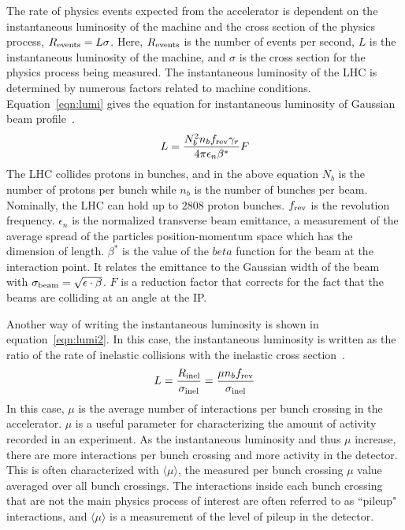 The rate of physics events expected from the accelerator is dependent on the instantaneous luminosity of the machine and the cross section of the physics process, $R_{\rm events} = L\sigma$. Here, $R_{\rm events}$ is the number of events per second, $L$ is the instantaneous luminosity of the machine, and $\sigma$ is the cross section for the physics process being measured. The instantaneous luminosity of the LHC is determined by numerous factors related to machine conditions. Equation~\ref{eqn:lumi} gives the equation for instantaneous luminosity of Gaussian beam profile~\cite{LHCReview}.
%
\begin{equation}
\label{eqn:lumi}
L = \frac{N_b^2 n_b f_{\rm rev} \gamma_r}{4\pi \epsilon_n \beta^*} F
\end{equation}
%
The LHC collides protons in bunches, and in the above equation $N_b$ is the number of protons per bunch while $n_b$ is the number of bunches per beam. Nominally, the LHC can hold up to $2808$ proton bunches. $f_{\rm rev}$ is the revolution frequency. $\epsilon_n$ is the normalized transverse beam emittance, a measurement of the average spread of the particles position-momentum space which has the dimension of length. $\beta^*$ is the value of the $beta$ function for the beam at the interaction point. It relates the emittance to the Gaussian width of the beam with $\sigma_{\rm beam} = \sqrt{\epsilon \cdot \beta}$. $F$ is a reduction factor that corrects for the fact that the beams are colliding at an angle at the IP. 

Another way of writing the instantaneous luminosity is shown in equation~\ref{eqn:lumi2}. In this case, the instantaneous luminosity is written as the ratio of the rate of inelastic collisions with the inelastic cross section~\cite{lumi-paper}. 
%
\begin{equation}
\label{eqn:lumi2}
L = \frac{R_{\rm inel}}{\sigma_{\rm inel}} = \frac{\mu n_b f_{\rm rev}}{\sigma_{\rm inel}}
\end{equation}
%
In this case, $\mu$ is the average number of interactions per bunch crossing in the accelerator. $\mu$ is a useful parameter for characterizing the amount of activity recorded in an experiment. As the instantaneous luminosity and thus $\mu$ increase, there are more interactions per bunch crossing and more activity in the detector. This is often characterized with $\langle \mu \rangle$, the measured per bunch crossing $\mu$ value averaged over all bunch crossings. The interactions inside each bunch crossing that are not the main physics process of interest are often referred to as ``pileup" interactions, and $\langle \mu \rangle$ is a measurement of the level of pileup in the detector. 

